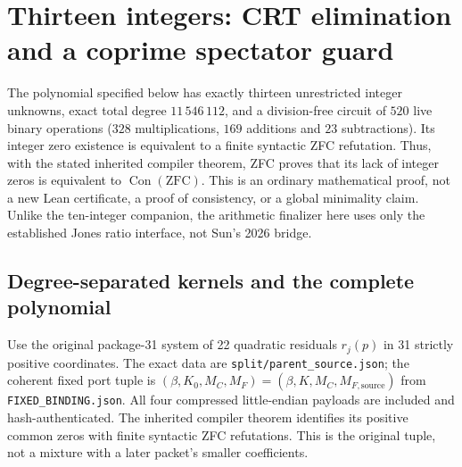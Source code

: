 \section{Thirteen integers: CRT elimination and a coprime spectator guard}
\label{sec:jones-seeded}

The polynomial specified below has exactly thirteen unrestricted integer
unknowns, exact total degree $11\,546\,112$, and a division-free circuit of
$520$ live binary operations ($328$ multiplications, $169$ additions and
$23$ subtractions). Its integer zero existence is equivalent to a finite
syntactic ZFC refutation. Thus, with the stated inherited compiler theorem,
ZFC proves that its lack of integer zeros is equivalent to
$\operatorname{Con}(\mathrm{ZFC})$. This is an ordinary mathematical proof,
not a new Lean certificate, a proof of consistency, or a global minimality
claim. Unlike the ten-integer companion, the arithmetic finalizer here uses
only the established Jones ratio interface, not Sun's 2026 bridge.

\subsection{Degree-separated kernels and the complete polynomial}
Use the original package-31 system of 22 quadratic residuals
$r_j(p)$ in 31 strictly positive coordinates. The exact data are
\texttt{split/parent\_source.json}; the coherent fixed port tuple is
$(\beta,K_0,M_C,M_F)=(\beta,K,M_C,M_{F,\mathrm{source}})$ from
\texttt{FIXED\_BINDING.json}. All four compressed little-endian payloads are
included and hash-authenticated. The inherited compiler theorem identifies
its positive common zeros with finite syntactic ZFC refutations. This is the
original tuple, not a mixture with a later packet's smaller coefficients.

